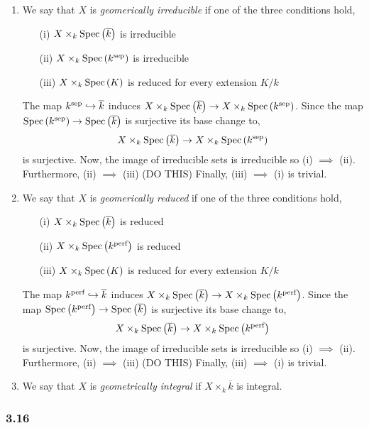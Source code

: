 \documentclass[12pt]{article}
\begin{document}
\begin{enumerate}
\item We say that $X$ is \textit{geomerically irreducible} if one of the three conditions hold,
\begin{enumerate}
\item[(i)] $X \times_k \mathrm{Spec}\left( \overline{k} \right)$ is irreducible
\item[(ii)] $X \times_k \mathrm{Spec}\left( k^{\text{sep}} \right)$ is irreducible
\item[(iii)] $X \times_k \mathrm{Spec}\left( K \right)$ is reduced for every extension $K / k$
\end{enumerate}
The map $k^{\text{sep}} \hookrightarrow \overline{k}$ induces $X \times_k \mathrm{Spec}\left( \overline{k} \right) \to X \times_k \mathrm{Spec}\left( k^{\text{sep}} \right)$. Since the map $\mathrm{Spec}\left( k^{\text{sep}} \right) \to \mathrm{Spec}\left( \overline{k} \right)$ is surjective its base change to,
\[ X \times_k \mathrm{Spec}\left( \overline{k} \right) \to X \times_k \mathrm{Spec}\left( k^{\text{sep}} \right) \]
is surjective. Now, the image of irreducible sets is irreducible so (i) $\implies$ (ii). Furthermore, 
(ii) $\implies$ (iii) (DO THIS)
Finally, (iii) $\implies$ (i) is trivial. 

\item We say that $X$ is \textit{geomerically reduced} if one of the three conditions hold,
\begin{enumerate}
\item[(i)] $X \times_k \mathrm{Spec}\left( \overline{k} \right)$ is reduced
\item[(ii)] $X \times_k \mathrm{Spec}\left( k^{\text{perf}} \right)$ is reduced
\item[(iii)] $X \times_k \mathrm{Spec}\left( K \right)$ is reduced for every extension $K / k$
\end{enumerate}

The map $k^{\text{perf}} \hookrightarrow \overline{k}$ induces $X \times_k \mathrm{Spec}\left( \overline{k} \right) \to X \times_k \mathrm{Spec}\left( k^{\text{perf}} \right)$. Since the map $\mathrm{Spec}\left( k^{\text{perf}} \right) \to \mathrm{Spec}\left( \overline{k} \right)$ is surjective its base change to,
\[ X \times_k \mathrm{Spec}\left( \overline{k} \right) \to X \times_k \mathrm{Spec}\left( k^{\text{perf}} \right) \]
is surjective. Now, the image of irreducible sets is irreducible so (i) $\implies$ (ii). Furthermore, 
(ii) $\implies$ (iii) (DO THIS)
Finally, (iii) $\implies$ (i) is trivial. 

\item We say that $X$ is \textit{geometrically integral} if $X \times_k \overline{k}$ is integral. 
\end{enumerate}

\subsubsection{3.16}
\end{document}
